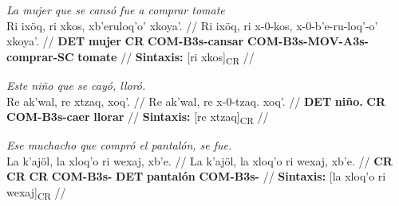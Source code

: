 \documentclass{article}%
\begin{document}
%
\par\medskip%
\ex
\textit{La mujer que se cansó fue a comprar tomate} \\
\begingl
\gla Ri ixöq, ri xkos, xb'eruloq'o' xkoya'. //
\glb Ri ixöq, ri x-0-kos, x-0-b'e-ru-loq'-o' xkoya'. //
\glc \textbf{DET} \textbf{mujer} \textbf{CR} \textbf{COM-}\textbf{B3s-}\textbf{cansar} \textbf{COM-}\textbf{B3s-}\textbf{MOV-}\textbf{A3s-}\textbf{comprar-}\textbf{SC} \textbf{tomate} //
\glft \textbf{Sintaxis:} [ri xkos]\textsubscript{CR} //
\endgl
\xe
%
\medskip%
\par\medskip%
\ex
\textit{Este niño que se cayó, lloró.} \\
\begingl
\gla Re ak'wal, re xtzaq, xoq'. //
\glb Re ak'wal, re x-0-tzaq. xoq'. //
\glc \textbf{DET} \textbf{niño.} \textbf{CR} \textbf{COM-}\textbf{B3s-}\textbf{caer} \textbf{llorar} //
\glft \textbf{Sintaxis:} [re xtzaq]\textsubscript{CR} //
\endgl
\xe
%
\medskip%
\par\medskip%
\ex
\textit{Ese muchacho que compró el pantalón, se fue.} \\
\begingl
\gla La k'ajöl, la xloq'o ri wexaj, xb'e. //
\glb La k'ajöl, la xloq'o ri wexaj, xb'e. //
\glc \textbf{CR} \textbf{CR} \textbf{CR} \textbf{COM-B3s-} \textbf{DET} \textbf{pantalón} \textbf{COM-B3s-} //
\glft \textbf{Sintaxis:} [la xloq'o ri wexaj]\textsubscript{CR} //
\endgl
\xe
%
\medskip

%
\end{document}
